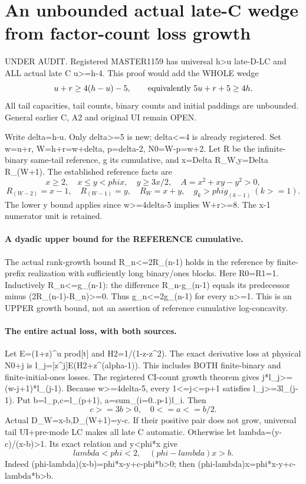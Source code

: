 \section{An unbounded actual late-C wedge from factor-count loss growth}
UNDER AUDIT. Registered MASTER1159 has universal h>u late-D-LC
and ALL actual late C u>=h-4. This proof would add the WHOLE wedge
\[
 u+r\ge4(h-u)-5,\qquad\hbox{equivalently }5u+r+5\ge4h.
\]
All tail capacities, tail counts, binary counts and initial paddings
are unbounded. General earlier C, A2 and original UI remain OPEN.

Write delta=h-u. Only delta>=5 is new; delta<=4 is already registered.
Set w=u+r, W=h+r=w+delta, p=delta-2, N0=W-p=w+2.
Let R be the infinite-binary same-tail reference, g its cumulative,
and x=Delta R_W,y=Delta R_(W+1). The established reference facts are
\[
 x\ge2,\quad x\le y<phi x,\quad y\ge3x/2,
 \quad A=x^2+xy-y^2>0,
\]
\[
 R_(W-2)=x-1,\quad R_(W-1)=y,\quad R_W=x+y,
 \quad g_k>phi g_(k-1)\ (k>=1).
\]
The lower y bound applies since w>=4delta-5 implies W+r>=8.
The x-1 numerator unit is retained.

\paragraph{A dyadic upper bound for the REFERENCE cumulative.}
The actual rank-growth bound R_n<=2R_(n-1) holds in the reference
by finite-prefix realization with sufficiently long binary/ones blocks.
Here R0=R1=1. Inductively R_n<=g_(n-1): the difference
R_n-g_(n-1) equals its predecessor minus (2R_(n-1)-R_n)>=0.
Thus g_n<=2g_(n-1) for every n>=1. This is an UPPER growth bound,
not an assertion of reference cumulative log-concavity.

\paragraph{The entire actual loss, with both sources.}
Let E=(1+z)^u prod[t] and H2=1/(1-z-z^2). The exact derivative loss
at physical N0+j is l_j=[z^j]E(H2+z^(alpha-1)). This includes BOTH
finite-binary and finite-initial-ones losses. The registered CI-count
growth theorem gives j*l_j>=(w-j+1)*l_(j-1).
Because w>=4delta-5, every 1<=j<=p+1 satisfies l_j>=3l_(j-1).
Put b=l_p,c=l_(p+1), a=sum_(i=0..p-1)l_i. Then
\[
 c>=3b>0,\quad 0<=a<=b/2.
\]
Actual D_W=x-b,D_(W+1)=y-c. If their positive pair does not grow,
universal tail UI+pre-mode LC makes all late C automatic. Otherwise
let lambda=(y-c)/(x-b)>1. Its exact relation and y<phi*x give
\[
 lambda<phi<2,\quad (phi-lambda)x>b.                 \tag{1}
\]
Indeed (phi-lambda)(x-b)=phi*x-y+c-phi*b>0; then
(phi-lambda)x=phi*x-y+c-lambda*b>b.

